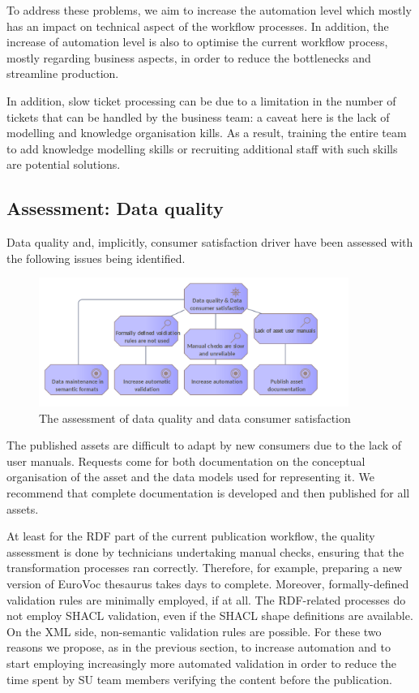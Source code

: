 	To address these problems, we aim to increase the automation level which mostly has an impact on technical aspect of the workflow processes. In addition, the increase of automation level is also to optimise the current workflow process, mostly regarding business aspects, in order to reduce the bottlenecks and streamline production.  
	
	In addition, slow ticket processing can be due to a limitation in the number of tickets that can be handled by the business team: a caveat here is the lack of modelling and knowledge organisation kills. As a result,  training the entire team to add knowledge modelling skills or recruiting additional staff with such skills are potential solutions. 
	

	\subsection{Assessment: Data quality}

    Data quality and, implicitly, consumer satisfaction driver have been assessed with the following issues being identified.
    
	\begin{figure}[!h]
		\centering
		\includegraphics[width=0.9\textwidth]{images/motivation/Data quality.png}
		\caption{The assessment of data quality and data consumer satisfaction}
		\label{fig:data-quality}
	\end{figure}

    The published assets are difficult to adapt by new consumers due to the lack of user manuals. Requests come for both documentation on the conceptual organisation of the asset and the data models used for representing it. We recommend that complete documentation is developed and then published for all assets.
    
    At least for the RDF part of the current publication workflow, the quality assessment is done by technicians undertaking manual checks, ensuring that the transformation processes ran correctly. Therefore, for example, preparing a new version of EuroVoc thesaurus takes days to complete. Moreover, formally-defined validation rules are minimally employed, if at all. The RDF-related processes do not employ SHACL validation, even if the SHACL shape definitions are available. On the XML side, non-semantic validation rules are possible. For these two reasons we propose, as in the previous section, to increase automation and to start employing increasingly more automated validation in order to reduce the time spent by SU team members verifying the content before the publication. 
    
